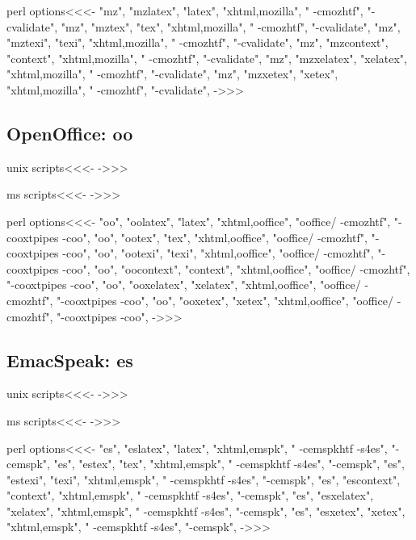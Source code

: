 \documentclass{article}
\begin{document}
\<perl options\><<<-
 "mz", "mzlatex",   "latex",   "xhtml,mozilla", " -cmozhtf",  "-cvalidate",
 "mz", "mztex",     "tex",     "xhtml,mozilla", " -cmozhtf",  "-cvalidate",
 "mz", "mztexi",    "texi",    "xhtml,mozilla", " -cmozhtf",  "-cvalidate",
 "mz", "mzcontext", "context", "xhtml,mozilla", " -cmozhtf",  "-cvalidate",
 "mz", "mzxelatex", "xelatex",   "xhtml,mozilla", " -cmozhtf",  "-cvalidate",
 "mz", "mzxetex",   "xetex",     "xhtml,mozilla", " -cmozhtf",  "-cvalidate",
->>>


\subsection{OpenOffice: oo}

\<unix scripts\><<<-
->>>

\<ms scripts\><<<-
->>>


\<perl options\><<<-
 "oo", "oolatex",   "latex",   "xhtml,ooffice", "ooffice/\! -cmozhtf",  "-cooxtpipes -coo",
 "oo", "ootex",     "tex",     "xhtml,ooffice", "ooffice/\! -cmozhtf",  "-cooxtpipes -coo",
 "oo", "ootexi",    "texi",    "xhtml,ooffice", "ooffice/\! -cmozhtf",  "-cooxtpipes -coo",
 "oo", "oocontext", "context", "xhtml,ooffice", "ooffice/\! -cmozhtf",  "-cooxtpipes -coo",
 "oo", "ooxelatex",   "xelatex",   "xhtml,ooffice", "ooffice/\! -cmozhtf",  "-cooxtpipes -coo",
 "oo", "ooxetex",     "xetex",     "xhtml,ooffice", "ooffice/\! -cmozhtf",  "-cooxtpipes -coo",
->>>





\subsection{EmacSpeak: es}

\<unix scripts\><<<-
->>>

\<ms scripts\><<<-
->>>


\<perl options\><<<-
 "es", "eslatex",   "latex",   "xhtml,emspk", " -cemspkhtf -s4es",  "-cemspk",
 "es", "estex",     "tex",     "xhtml,emspk", " -cemspkhtf -s4es",  "-cemspk",
 "es", "estexi",    "texi",    "xhtml,emspk", " -cemspkhtf -s4es",  "-cemspk",
 "es", "escontext", "context", "xhtml,emspk", " -cemspkhtf -s4es",  "-cemspk",
 "es", "esxelatex",   "xelatex",   "xhtml,emspk", " -cemspkhtf -s4es",  "-cemspk",
 "es", "esxetex",     "xetex",     "xhtml,emspk", " -cemspkhtf -s4es",  "-cemspk",
->>>
\end{document}
